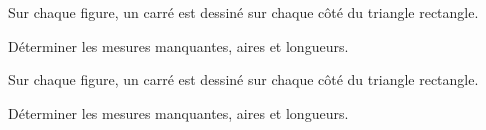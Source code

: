\begin{exercice*}
    Sur chaque figure, un carré est dessiné sur chaque côté du triangle rectangle.

    Déterminer les mesures manquantes, aires et longueurs.

\end{exercice*}
\begin{corrige}
    Sur chaque figure, un carré est dessiné sur chaque côté du triangle rectangle.

    Déterminer les mesures manquantes, aires et longueurs.

    \hspace*{-8mm}
    \vspace*{-2mm}
\end{corrige}